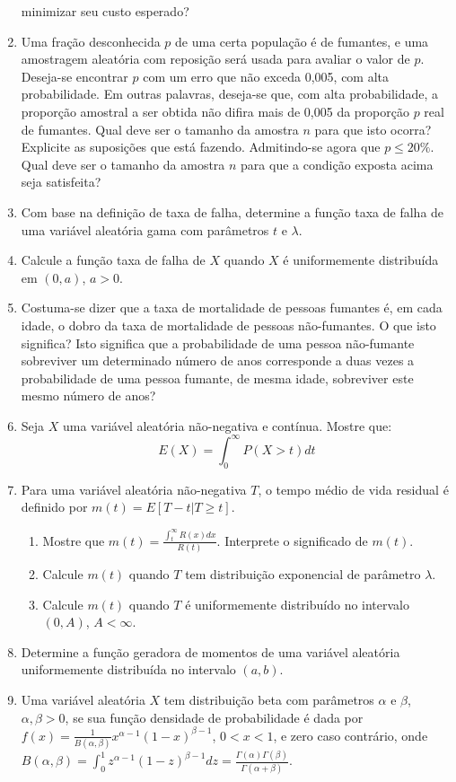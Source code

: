 \documentclass[
  10pt,
]{article}
\providecommand{\tightlist}{%
  \setlength{\itemsep}{0pt}\setlength{\parskip}{0pt}}
\begin{document}
\begin{enumerate}
  minimizar seu custo esperado?
\item
  Uma fração desconhecida \(p\) de uma certa população é de fumantes, e
  uma amostragem aleatória com reposição será usada para avaliar o valor
  de \(p\). Deseja-se encontrar \(p\) com um erro que não exceda 0,005,
  com alta probabilidade. Em outras palavras, deseja-se que, com alta
  probabilidade, a proporção amostral a ser obtida não difira mais de
  0,005 da proporção \(p\) real de fumantes. Qual deve ser o tamanho da
  amostra \(n\) para que isto ocorra? Explicite as suposições que está
  fazendo. Admitindo-se agora que \(p \leq 20\%\). Qual deve ser o
  tamanho da amostra \(n\) para que a condição exposta acima seja
  satisfeita?
\item
  Com base na definição de taxa de falha, determine a função taxa de
  falha de uma variável aleatória gama com parâmetros \(t\) e
  \(\lambda\).
\item
  Calcule a função taxa de falha de \(X\) quando \(X\) é uniformemente
  distribuída em \((0, a)\), \(a > 0\).
\item
  Costuma-se dizer que a taxa de mortalidade de pessoas fumantes é, em
  cada idade, o dobro da taxa de mortalidade de pessoas não-fumantes. O
  que isto significa? Isto significa que a probabilidade de uma pessoa
  não-fumante sobreviver um determinado número de anos corresponde a
  duas vezes a probabilidade de uma pessoa fumante, de mesma idade,
  sobreviver este mesmo número de anos?
\item
  Seja \(X\) uma variável aleatória não-negativa e contínua. Mostre que:
  \[ E(X) = \int_{0}^{\infty} P(X > t)dt \]
\item
  Para uma variável aleatória não-negativa \(T\), o tempo médio de vida
  residual é definido por \(m(t) = E[T - t | T \geq t]\).

  \begin{enumerate}
  \def\labelenumii{(\alph{enumii})}
  \tightlist
  \item
    Mostre que \(m(t) = \frac{\int_{t}^{\infty} R(x)dx}{R(t)}\).
    Interprete o significado de \(m(t)\).
  \item
    Calcule \(m(t)\) quando \(T\) tem distribuição exponencial de
    parâmetro \(\lambda\).
  \item
    Calcule \(m(t)\) quando \(T\) é uniformemente distribuído no
    intervalo \((0, A)\), \(A < \infty\).
  \end{enumerate}
\item
  Determine a função geradora de momentos de uma variável aleatória
  uniformemente distribuída no intervalo \((a, b)\).
\item
  Uma variável aleatória \(X\) tem distribuição beta com parâmetros
  \(\alpha\) e \(\beta\), \(\alpha, \beta > 0\), se sua função densidade
  de probabilidade é dada por
  \(f(x) = \frac{1}{B(\alpha,\beta)}x^{\alpha-1}(1-x)^{\beta-1}\),
  \(0 < x < 1\), e zero caso contrário, onde
  \(B(\alpha,\beta) = \int_{0}^{1} z^{\alpha-1}(1-z)^{\beta-1}dz = \frac{\Gamma(\alpha)\Gamma(\beta)}{\Gamma(\alpha+\beta)}\).


\end{enumerate}
\end{document}
